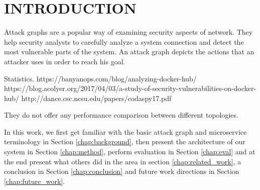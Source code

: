 \section{INTRODUCTION}

Attack graphs are a popular way of examining security aspects of network. They help security analysts to carefully analyze a system connection and detect the most vulnerable parts of the system. An attack graph depicts the actions that an attacker uses in order to reach his goal.  

Statistics. 
https://banyanops.com/blog/analyzing-docker-hub/
https://blog.acolyer.org/2017/04/03/a-study-of-security-vulnerabilities-on-docker-hub/
http://dance.csc.ncsu.edu/papers/codaspy17.pdf \cite{shu2017study}

They do not offer any performance comparison between different topologies. 

In this work, we first get familiar with the basic attack graph and microservice terminology in Section \ref{chap:background}, then present the architecture of our system in Section \ref{chap:method}, perform evaluation in Section \ref{chap:eval} and at the end present what others did in the area in section \ref{chap:related_work}, a conclusion in Section \ref{chap:conclusion} and future work directions in Section \ref{chap:future_work}.

